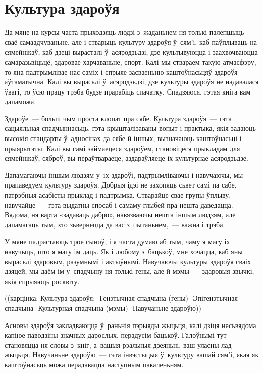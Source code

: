 \section{Культура здароўя}

Да мяне на курсы часта прыходзяць людзі з~жаданьнем ня толькі палепшыць сваё самаадчуваньне, але і стварыць культуру здароўя ў~сям'і, каб паўплываць на сямейнікаў, каб дзеці вырасталі ў~асяродзьдзі, дзе культывуюцца і заахвочваюцца самаразьвіцьцё, здаровае харчаваньне, спорт. Калі мы ствараем такую атмасфэру, то яна падтрымлівае нас саміх і спрыяе засваеньню каштоўнасьцяў здароўя аўтаматычна. Калі вы вырасьлі ў~асяродзьдзі, дзе культуры здароўя не надавалася ўвагі, то ўсю працу трэба будзе прарабіць спачатку. Спадзяюся, гэтая кніга вам дапаможа.

Здароўе~--- больш чым проста клопат пра сябе. Культура здароўя~--- гэта сацыяльная спадчыннасьць, гэта крышталізаваны вопыт і практыка, якія задаюць высокія стандарты ў~адносінах да сябе й іншых, вызначаюць каштоўнасьці і прыярытэты. Калі вы самі займаецеся здароўем, становіцеся прыкладам для сямейнікаў, сяброў, вы пераўтвараеце, аздараўляеце іх культурнае асяродзьдзе.

Дапамагаючы іншым людзям у~іх здароўі, падтрымліваючы і навучаючы, мы прапаведуем культуру здароўя. Добрыя ідэі не захопяць сьвет самі па сабе, патрэбныя асабісты прыклад і падтрымка. Стварайце свае групы ўплыву, навучайце~--- гэта выдатны спосаб і самаму глыбей пра нешта даведацца. Вядома, ня варта «задаваць дабро», навязваючы нешта іншым людзям, але дапамагаць тым, хто зьвернецца да вас з~пытаньнем,~--- важна і трэба.

У мяне падрастаюць трое сыноў, і я часта думаю аб тым, чаму я магу іх навучыць, што я магу ім даць. Як і любому з~бацькоў, мне хочацца, каб яны вырасьлі здаровым, разумнымі і актыўнымі. Навучаючы культуры здароўя сваіх дзяцей, мы даём ім у~спадчыну ня толькі гены, але й мэмы~--- здаровыя звычкі, якія спрыяюць росквіту.

((карцінка: Культура здароўя: -Генэтычная спадчына (гены) -Эпігенэтычная спадчына -Культурная спадчына (мэмы) -Навучаньне здароўю))

Асновы здароўя закладваюцца ў~раньнія пэрыяды жыцьця, калі дзіця несьвядома капіюе паводзіны значных дарослых, перадусім бацькоў. Галоўнымі тут становяцца ня словы з~кніг, а~вашыя рэальныя дзеяньні, ваш уласны лад жыцьця. Навучаньне здароўю~--- гэта інвэстыцыя ў~культуру вашай сям'і, якая як каштоўнасьць можа перадавацца наступным пакаленьням.


